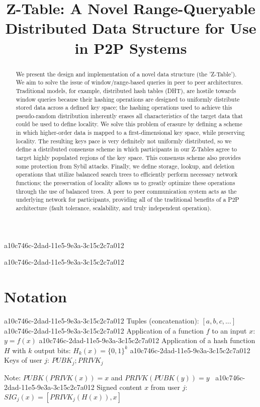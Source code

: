 \documentclass[12pt]{article}
\title{Z-Table: A Novel Range-Queryable Distributed Data Structure for Use in P2P Systems}
\begin{document}
a10c746c-2dad-11e5-9e3a-3c15c2c7a012
\maketitle

\begin{abstract}
We present the design and implementation of a novel data structure (the 'Z-Table'). We aim to solve the issue of window/range-based queries in peer to peer architectures. Traditional models, for example,  distributed hash tables (DHT), are hostile towards window queries because their hashing operations are designed to uniformly distribute stored data across a defined key space; the hashing operations used to achieve this pseudo-random distribution inherently erases all characteristics of the target data that could be used to define locality. We solve this problem of erasure by defining a scheme in which higher-order data is mapped to a first-dimensional key space, while preserving locality. The resulting keys pace is very definitely not uniformly distributed, so we define a distributed consensus scheme in which participants in our Z-Tables agree to target highly populated regions of the key space. This consensus scheme also provides some protection from Sybil attacks. Finally, we define storage, lookup, and deletion operations that utilize balanced search trees to efficiently perform necessary network functions; the preservation of locality allows us to greatly optimize these operations through the use of balanced trees. A peer to peer communication system acts as the underlying network for participants, providing all of the traditional benefits of a P2P architecture (fault tolerance, scalability, and truly independent operation).
\end{abstract}

a10c746c-2dad-11e5-9e3a-3c15c2c7a012\section{Notation}
a10c746c-2dad-11e5-9e3a-3c15c2c7a012
Tuples (concatenation): $[a,b,c,...]$
a10c746c-2dad-11e5-9e3a-3c15c2c7a012
Application of a function $f$ to an input $x$: $y=f(x)$
a10c746c-2dad-11e5-9e3a-3c15c2c7a012
Application of a hash function $H$ with $k$ output bits: $H_{k}(x) = \{0,1\}^k$
a10c746c-2dad-11e5-9e3a-3c15c2c7a012
Keys of user $j$: $ PUBK_j; PRIVK_j $

Note: $PUBK(PRIVK(x)) = x$ and $PRIVK(PUBK(y)) = y$~
a10c746c-2dad-11e5-9e3a-3c15c2c7a012
Signed content $x$ from user $j$: $SIG_j(x) = \left[ PRIVK_j( H(x) ), x \right]$
\end{document}
